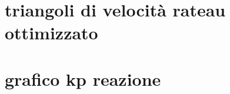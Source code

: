 \documentclass[a4paper, 15pt]{article}
\begin{document}
\section{ triangoli di velocità rateau ottimizzato}

\section{grafico kp reazione}
\end{document}
